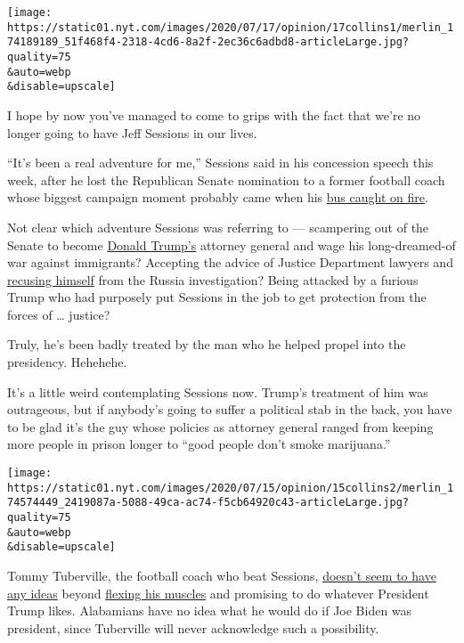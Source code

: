 \texttt{[image: https://static01.nyt.com/images/2020/07/17/opinion/17collins1/merlin\_174189189\_51f468f4-2318-4cd6-8a2f-2ec36c6adbd8-articleLarge.jpg?quality=75\\\&auto=webp\\\&disable=upscale]}

I hope by now you've managed to come to grips with the fact that we're
no longer going to have Jeff Sessions in our lives.

``It's been a real adventure for me,'' Sessions said in his concession
speech this week, after he lost the Republican Senate nomination to a
former football coach whose biggest campaign moment probably came when
his
\href{https://www.al.com/news/2020/07/tommy-tuberville-campaign-bus-catches-fire-on-alabama-interstate.html}{bus
caught on fire}.

Not clear which adventure Sessions was referring to --- scampering out
of the Senate to become
\href{https://www.nytimes.com/2019/07/29/nyregion/trump-sharpton-ny-history.html}{Donald
Trump's} attorney general and wage his long-dreamed-of war against
immigrants? Accepting the advice of Justice Department lawyers and
\href{https://www.nytimes.com/2018/01/04/us/politics/trump-sessions-russia-mcgahn.html}{recusing
himself} from the Russia investigation? Being attacked by a furious
Trump who had purposely put Sessions in the job to get protection from
the forces of \ldots{} justice?

Truly, he's been badly treated by the man who he helped propel into the
presidency. Hehehehe.

It's a little weird contemplating Sessions now. Trump's treatment of him
was outrageous, but if anybody's going to suffer a political stab in the
back, you have to be glad it's the guy whose policies as attorney
general ranged from keeping more people in prison longer to ``good
people don't smoke marijuana.''

\texttt{[image: https://static01.nyt.com/images/2020/07/15/opinion/15collins2/merlin\_174574449\_2419087a-5088-49ca-ac74-f5cb64920c43-articleLarge.jpg?quality=75\\\&auto=webp\\\&disable=upscale]}

Tommy Tuberville, the football coach who beat Sessions,
\href{https://www.newsbreak.com/alabama/birmingham/news/0PZMVnBr/tommy-tuberville-goes-low-profile-to-run-out-clock-in-runoff-with-jeff-sessions}{doesn't
seem to have any ideas} beyond
\href{https://www.youtube.com/watch?v=NmgO9qwgPEc}{flexing his muscles}
and promising to do whatever President Trump likes. Alabamians have no
idea what he would do if Joe Biden was president, since Tuberville will
never acknowledge such a possibility.

